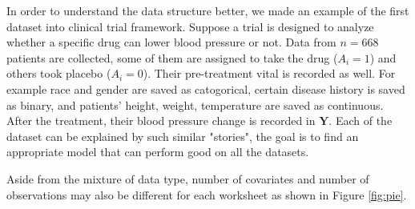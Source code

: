 \documentclass[12pt, oneside]{article}
\newcommand{\bY}{\mathbf{Y}}
\begin{document}
In order to understand the data structure better, we made an example of the first dataset into clinical trial framework. Suppose a trial is designed to analyze whether a specific drug can lower blood pressure or not. Data from $n=668$ patients are collected, some of them are assigned to take the drug ($A_i=1$) and others took placebo ($A_i=0$). Their pre-treatment vital is recorded as well. For example race and gender are saved as catogorical, certain disease history is saved as binary, and patients' height, weight, temperature are saved as continuous. After the treatment, their blood pressure change is recorded in $\bY$. Each of the dataset can be explained by such similar "stories", the goal is to find an appropriate model that can perform good on all the datasets. 

Aside from the mixture of data type, number of covariates and number of observations may also be different for each worksheet as shown in Figure \ref{fig:pie}.
\end{document}
